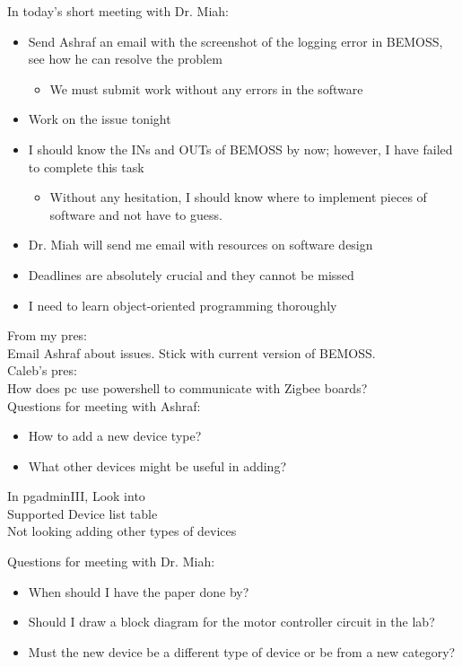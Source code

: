 \documentclass[fontsize=11pt, %
                             paper=letter, %
                             twoside, %
                             captions=tableheading,
                             index=totoc,
                             hyperref]{labbook}
\begin{document}
\begin{addmargin}[0cm]{0cm}
In today's short meeting with Dr. Miah:
\begin{itemize}
\item Send Ashraf an email with the screenshot of the logging error in BEMOSS, see how he can resolve the problem
\begin{itemize}
\item We must submit work without any errors in the software
\end{itemize}
\item Work on the issue tonight
\item I should know the INs and OUTs of BEMOSS by now; however, I have failed to complete this task
\begin{itemize}
\item Without any hesitation, I should know where to implement pieces of software and not have to guess.
\end{itemize}
\item Dr. Miah will send me email with resources on software design
\item Deadlines are absolutely crucial and they cannot be missed
\item I need to learn object-oriented programming thoroughly
\end{itemize}

From my pres:\\
Email Ashraf about issues. Stick with current version of BEMOSS.\\
Caleb's pres:\\
How does pc use powershell to communicate with Zigbee boards?\\

Questions for meeting with Ashraf:
\begin{itemize}
\item How to add a new device type?
\item What other devices might be useful in adding?
\end{itemize}
In pgadminIII,
Look into\\
Supported Device list table\\
Not looking adding other types of devices

Questions for meeting with Dr. Miah:
\begin{itemize}
\item When should I have the paper done by?
\item Should I draw a block diagram for the motor controller circuit in the lab?
\item Must the new device be a different type of device or be from a new category?
\end{itemize}


\end{addmargin}
\end{document}

